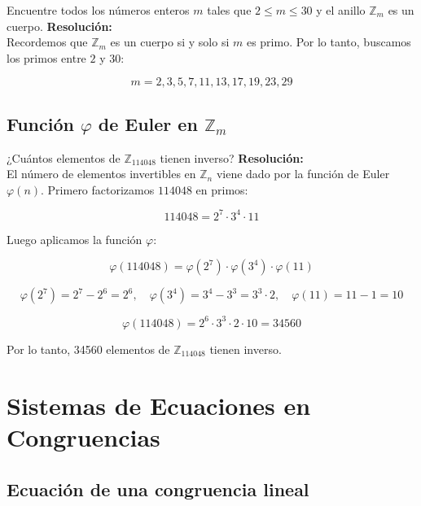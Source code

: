 \documentclass[a4paper,12pt]{article}
\begin{document}
\begin{ejercicio}[title=Ejercicio 27]
Encuentre todos los números enteros $m$ tales que $2 \le m \le 30$ y el anillo $\mathbb{Z}_m$ es un cuerpo.
\tcblower
\textbf{Resolución:} \\
Recordemos que $\mathbb{Z}_m$ es un cuerpo si y solo si $m$ es primo.  
Por lo tanto, buscamos los primos entre $2$ y $30$:

\[
\boxed{m = 2, 3, 5, 7, 11, 13, 17, 19, 23, 29}
\]
\end{ejercicio}

\subsection{Función \(\varphi\) de Euler en \(\mathbb{Z}_m\)}

\begin{ejercicio}[title=Ejercicio 26]
¿Cuántos elementos de $\mathbb{Z}_{114048}$ tienen inverso?
\tcblower
\textbf{Resolución:} \\
El número de elementos invertibles en $\mathbb{Z}_n$ viene dado por la función de Euler $\varphi(n)$.  
Primero factorizamos $114048$ en primos:

\[
114048 = 2^7 \cdot 3^4 \cdot 11
\]

Luego aplicamos la función $\varphi$:

\[
\varphi(114048) = \varphi(2^7) \cdot \varphi(3^4) \cdot \varphi(11)
\]

\[
\varphi(2^7) = 2^7 - 2^6 = 2^6, \quad
\varphi(3^4) = 3^4 - 3^3 = 3^3 \cdot 2, \quad
\varphi(11) = 11-1 = 10
\]

\[
\varphi(114048) = 2^6 \cdot 3^3 \cdot 2 \cdot 10 = \boxed{34560}
\]

Por lo tanto, 34560 elementos de $\mathbb{Z}_{114048}$ tienen inverso.
\end{ejercicio}

\section{Sistemas de Ecuaciones en Congruencias}

\subsection{Ecuación de una congruencia lineal}
\end{document}
